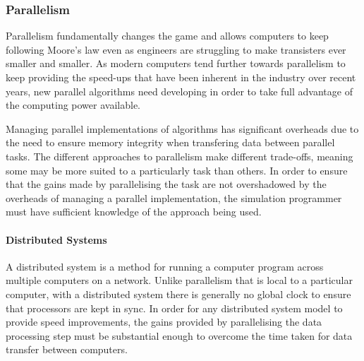 \documentclass{UoYCSproject}
\begin{document}


\subsubsection{Parallelism}
Parallelism fundamentally changes the game and allows computers to keep following Moore's law even as engineers are struggling to make transisters ever smaller and smaller\cite{concurrency_revolution}.
As modern computers tend further towards parallelism to keep providing the speed-ups that have been inherent in the industry over recent years, new parallel algorithms need developing in order to take full advantage of the computing power available.

Managing parallel implementations of algorithms has significant overheads due to the need to ensure memory integrity when transfering data between parallel tasks.
The different approaches to parallelism make different trade-offs, meaning some may be more suited to a particularly task than others.
In order to ensure that the gains made by parallelising the task are not overshadowed by the overheads of managing a parallel implementation, the simulation programmer must have sufficient knowledge of the approach being used.

\paragraph{Distributed Systems}
A distributed system is a method for running a computer program across multiple computers on a network.
Unlike parallelism that is local to a particular computer, with a distributed system there is generally no global clock to ensure that processors are kept in sync.
In order for any distributed system model to provide speed improvements, the gains provided by parallelising the data processing step must be substantial enough to overcome the time taken for data transfer between computers.
\end{document}
